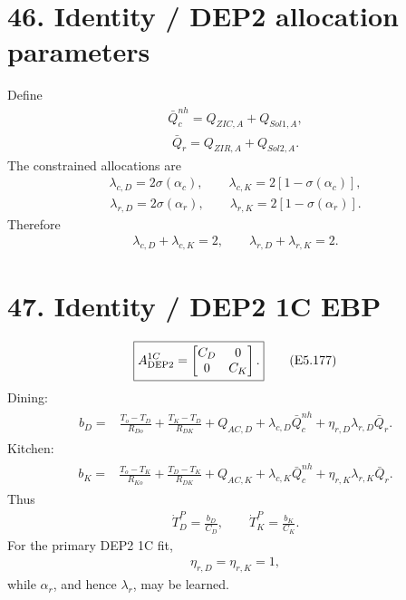 \documentclass[11pt]{article}
\begin{document}
\section*{46. Identity / DEP2 allocation parameters}

Define
\begin{align}
\boxed{\bar Q_c^{nh}=Q_{ZIC,A}+Q_{Sol1,A},}
\tag{E5.172}
\end{align}
\begin{align}
\boxed{\bar Q_r=Q_{ZIR,A}+Q_{Sol2,A}.}
\tag{E5.173}
\end{align}
The constrained allocations are
\begin{align}
\boxed{\lambda_{c,D}=2\sigma(\alpha_c),\qquad\lambda_{c,K}=2[1-\sigma(\alpha_c)],}
\tag{E5.174}
\end{align}
\begin{align}
\boxed{\lambda_{r,D}=2\sigma(\alpha_r),\qquad\lambda_{r,K}=2[1-\sigma(\alpha_r)].}
\tag{E5.175}
\end{align}
Therefore
\begin{align}
\boxed{\lambda_{c,D}+\lambda_{c,K}=2,\qquad\lambda_{r,D}+\lambda_{r,K}=2.}
\tag{E5.176}
\end{align}

\section*{47. Identity / DEP2 1C EBP}

\begin{align}
\boxed{A_{\rm DEP2}^{1C}=\begin{bmatrix}C_D&0\\0&C_K\end{bmatrix}.}
\tag{E5.177}
\end{align}
Dining:
\begin{align}
\boxed{\begin{aligned}b_D={}&\frac{T_o-T_D}{R_{Do}}+\frac{T_K-T_D}{R_{DK}}+Q_{AC,D}+\lambda_{c,D}\bar Q_c^{nh}+\eta_{r,D}\lambda_{r,D}\bar Q_r.\end{aligned}}
\tag{E5.178}
\end{align}
Kitchen:
\begin{align}
\boxed{\begin{aligned}b_K={}&\frac{T_o-T_K}{R_{Ko}}+\frac{T_D-T_K}{R_{DK}}+Q_{AC,K}+\lambda_{c,K}\bar Q_c^{nh}+\eta_{r,K}\lambda_{r,K}\bar Q_r.\end{aligned}}
\tag{E5.179}
\end{align}
Thus
\begin{align}
\boxed{\dot T_D^P=\frac{b_D}{C_D},\qquad\dot T_K^P=\frac{b_K}{C_K}.}
\tag{E5.180}
\end{align}
For the primary DEP2 1C fit,
\begin{align}
\boxed{\eta_{r,D}=\eta_{r,K}=1,}
\tag{E5.181}
\end{align}
while \(\alpha_r\), and hence \(\lambda_r\), may be learned.
\end{document}
